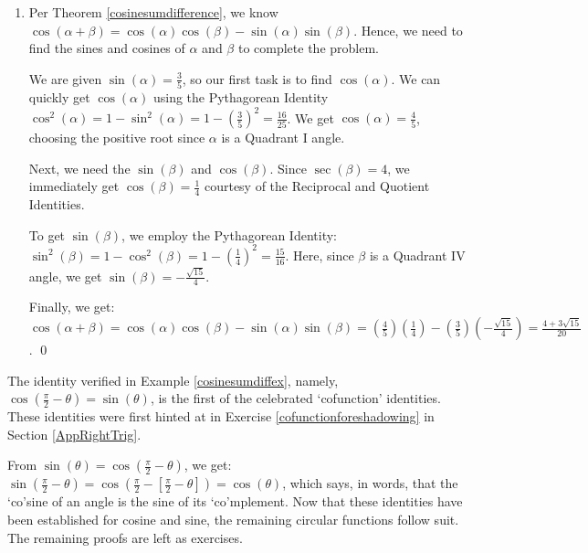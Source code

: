 \documentclass{ximera}
\begin{document}
\begin{example}
\begin{enumerate}
\item  Per Theorem \ref{cosinesumdifference}, we know $\cos(\alpha + \beta) = \cos(\alpha) \cos(\beta) - \sin(\alpha) \sin(\beta)$.  Hence, we need to find the sines and cosines of $\alpha$ and $\beta$ to complete the problem.

 

We are given  $\sin(\alpha) = \frac{3}{5}$, so our first task is to find $\cos(\alpha)$.  We can quickly get $\cos(\alpha)$ using the Pythagorean Identity $\cos^{2}(\alpha) = 1 - \sin^{2}(\alpha) = 1 - \left(\frac{3}{5}\right)^2 = \frac{16}{25}$.  We get $\cos(\alpha) =  \frac{4}{5}$, choosing the positive root  since $\alpha$ is a Quadrant I angle.

 

Next, we need the $\sin(\beta)$ and $\cos(\beta)$.  Since $\sec(\beta) = 4$, we immediately get $\cos(\beta) = \frac{1}{4}$ courtesy of the Reciprocal and Quotient Identities.  

 

To get $\sin(\beta)$, we employ the Pythagorean Identity: $\sin^{2}(\beta) = 1 - \cos^{2}(\beta) = 1 - \left(\frac{1}{4} \right)^2 = \frac{15}{16}$.  Here, since $\beta$ is a Quadrant IV angle, we get $\sin(\beta) =  - \frac{\sqrt{15}}{4}$.

 

Finally, we get: $\cos(\alpha + \beta) = \cos(\alpha) \cos(\beta) - \sin(\alpha) \sin(\beta) = \left( \frac{4}{5} \right)  \left( \frac{1}{4} \right)  -  \left( \frac{3}{5} \right)   \left( - \frac{\sqrt{15}}{4} \right)  = \frac{4+3\sqrt{15}}{20}$. \qed


\end{enumerate}


\end{example}

The identity verified in Example \ref{cosinesumdiffex}, namely, $\cos\left(\frac{\pi}{2} - \theta\right) = \sin(\theta)$,  is the first of the celebrated `cofunction' identities.  These identities were first hinted at in Exercise \ref{cofunctionforeshadowing} in Section \ref{AppRightTrig}. 

 

From $ \sin(\theta) = \cos\left(\frac{\pi}{2} - \theta\right) $, we get:  $\sin\left(\frac{\pi}{2} - \theta\right) = \cos\left(\frac{\pi}{2} -\left[\frac{\pi}{2} - \theta\right]\right) = \cos(\theta)$, which says, in words,  that the `co'sine of an angle is the sine of its `co'mplement.  Now that these identities have been established for cosine and sine, the remaining circular functions follow suit.  The remaining proofs are left as exercises.
\end{document}
